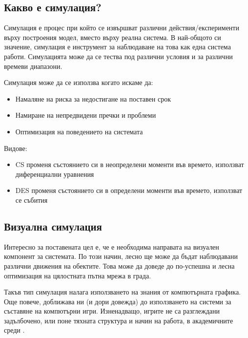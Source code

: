 	\subsection{Какво е симулация?}
	
		Симулация е процес при който се извършват различни действия/експерименти върху построения модел, 
		вместо върху реална система. В най-общото си значение, симулация е инструмент за наблюдаване на това
		как една система работи. Симулацията може да се тества под различни условия и за различни времеви диапазони.
		
		Симулация може да се използва когато искаме да:
		
		\begin{itemize}		
			\item Намаляне на риска за недостигане на поставен срок					
 			\item Намиране на непредвидени пречки и проблеми 			
 			\item Оптимизация на поведението на системата 			
		\end{itemize}
		
		Видове:
		
		\begin{itemize}
		
			\item \ac{CS} променя състоянието си в неопределени моменти във времето,
			 използват диференциални уравнения
			 
			\item \ac{DES} променя състоянието си в определени моменти във
			 времето, използват се събития
			 
		\end{itemize}
		
	\subsection{Визуална симулация}
	
		Интересно за поставената цел е, че е необходима направата на визуален компонент за системата.
		По този начин, лесно ще може да бъдат наблюдавани различни движения на обектите. Това може да 
		доведе до по-успешна и лесна оптимизация на цялостната пътна мрежа в града.
		
		Такъв тип симулация налага използването на знания от компютърната графика. 
		Още повече, доближава ни (и дори довежда) до използването на системи за съставяне на компютърни игри. 
		Изненадващо, игрите не са разглеждани задълбочено, или поне тяхната структура и начин на работа, 
		в академичните среди \cite{Holzkorn}.
		
